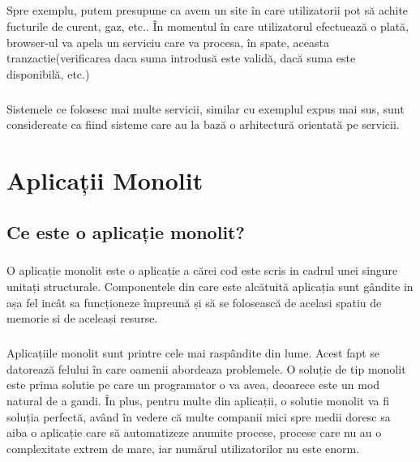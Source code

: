 \documentclass[12pt]{report}
\begin{document}
  \paragraph{}
  Spre exemplu, putem presupune ca avem un site în care utilizatorii pot să achite fucturile de curent, gaz, etc.. În momentul în care utilizatorul efectuează o plată, browser-ul va apela un serviciu care va procesa, în spate, aceasta tranzactie(verificarea daca suma introdusă este validă, dacă suma este disponibilă, etc.)
  \paragraph{}
  Sistemele ce folosesc mai multe servicii, similar cu exemplul expus mai sus, sunt considereate ca fiind sisteme care au la bază o arhitectură orientată pe servicii.
  \chapter{Aplicații Monolit}
  	\section{Ce este o aplicație monolit?}
  	\paragraph{}O aplicație monolit este o aplicație a cărei cod este scris in cadrul unei singure unitați structurale. Componentele din care este alcătuită aplicația sunt gândite in așa fel incât sa funcționeze împreună și să se folosească de acelasi spatiu de memorie si de aceleași resurse.
  	\paragraph{}Aplicațiile monolit sunt printre cele mai raspândite din lume. Acest fapt se datorează felului în care oamenii abordeaza problemele. O soluție de tip monolit este prima solutie pe care un programator o va avea, deoarece este un mod natural de a gandi. În plus, pentru multe din aplicații, o solutie monolit va fi soluția perfectă, având în vedere că multe companii mici spre medii doresc sa aiba o aplicație care să automatizeze anumite procese, procese care nu au o complexitate extrem de mare, iar numărul utilizatorilor nu este enorm. 
\end{document}
